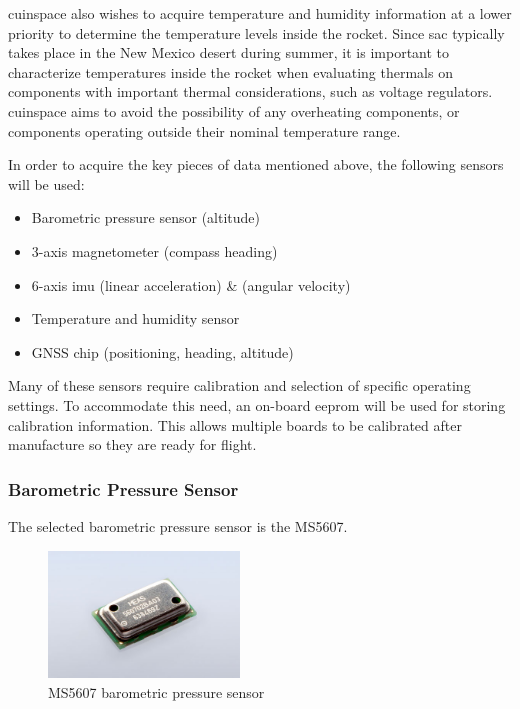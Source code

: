 \Gls{cuinspace} also wishes to acquire temperature and humidity information at a lower priority to determine the temperature levels inside the rocket. Since \gls{sac} typically takes place in the New Mexico desert during summer, it is important to characterize temperatures inside the rocket when evaluating thermals on components with important thermal considerations, such as voltage regulators. \Gls{cuinspace} aims to avoid the possibility of any overheating components, or components operating outside their nominal temperature range.

In order to acquire the key pieces of data mentioned above, the following sensors will be used:

\begin{itemize}
    \item Barometric pressure sensor (altitude)
    \item 3-axis magnetometer (compass heading)
    \item 6-axis \acrfull{imu} (linear acceleration) \& (angular velocity)
    \item Temperature and humidity sensor
    \item GNSS chip (positioning, heading, altitude)
\end{itemize}

Many of these sensors require calibration and selection of specific operating settings. To accommodate this need, an
on-board \gls{eeprom} will be used for storing calibration information. This allows multiple boards to be calibrated
after manufacture so they are ready for flight.

\subsubsection{Barometric Pressure Sensor}

The selected barometric pressure sensor is the MS5607.

\begin{figure}[H]
    \centering
    \includegraphics[width=2in]{assets/images/ms5607.jpg}
    \caption{MS5607 barometric pressure sensor \cite{ms5607-pic}}
\end{figure}

